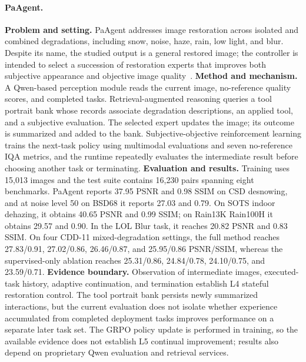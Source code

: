 \paragraph{PaAgent.}
\textbf{Problem and setting.} PaAgent addresses image restoration across isolated and combined degradations, including snow, noise, haze, rain, low light, and blur. Despite its name, the studied output is a general restored image; the controller is intended to select a succession of restoration experts that improves both subjective appearance and objective image quality~\cite{avg260317055}. \textbf{Method and mechanism.} A Qwen-based perception module reads the current image, no-reference quality scores, and completed tasks. Retrieval-augmented reasoning queries a tool portrait bank whose records associate degradation descriptions, an applied tool, and a subjective evaluation. The selected expert updates the image; its outcome is summarized and added to the bank. Subjective-objective reinforcement learning trains the next-task policy using multimodal evaluations and seven no-reference IQA metrics, and the runtime repeatedly evaluates the intermediate result before choosing another task or terminating. \textbf{Evaluation and results.} Training uses 15,013 images and the test suite contains 16,230 pairs spanning eight benchmarks. PaAgent reports 37.95 PSNR and 0.98 SSIM on CSD desnowing, and at noise level 50 on BSD68 it reports 27.03 and 0.79. On SOTS indoor dehazing, it obtains 40.65 PSNR and 0.99 SSIM; on Rain13K Rain100H it obtains 29.57 and 0.90. In the LOL Blur task, it reaches 20.82 PSNR and 0.83 SSIM. On four CDD-11 mixed-degradation settings, the full method reaches 27.83/0.91, 27.02/0.86, 26.46/0.87, and 25.95/0.86 PSNR/SSIM, whereas the supervised-only ablation reaches 25.31/0.86, 24.84/0.78, 24.10/0.75, and 23.59/0.71. \textbf{Evidence boundary.} Observation of intermediate images, executed-task history, adaptive continuation, and termination establish L4 stateful restoration control. The tool portrait bank persists newly summarized interactions, but the current evaluation does not isolate whether experience accumulated from completed deployment tasks improves performance on a separate later task set. The GRPO policy update is performed in training, so the available evidence does not establish L5 continual improvement; results also depend on proprietary Qwen evaluation and retrieval services.

